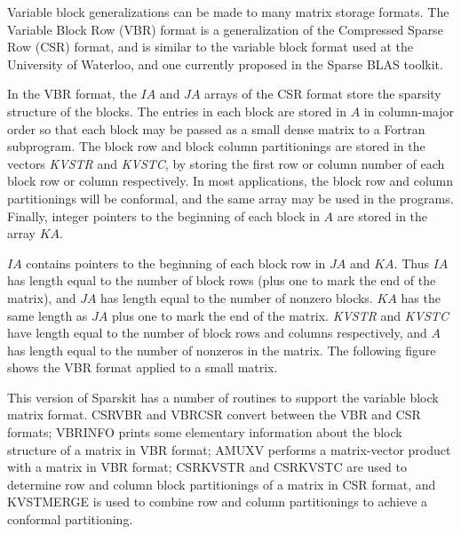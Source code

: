 \documentclass[12pt]{article}
\begin{document}
Variable block generalizations can be made to many matrix storage
formats.  The Variable Block Row (VBR) format is a generalization of the
Compressed Sparse Row (CSR) format, and is similar to the variable
block format used at the University of Waterloo, and one currently
proposed in the Sparse BLAS toolkit.

In the VBR format, the $IA$ and $JA$ arrays of the CSR format store the
sparsity structure of the blocks.  The entries in each block are stored
in $A$ in column-major order so that each block may be passed as a small
dense matrix to a Fortran subprogram.  The block row and block column
partitionings are stored in the vectors {\em KVSTR} and {\em KVSTC},
by storing the first row or column number of each block row or column
respectively.  In most applications, the block row and column partitionings
will be conformal, and the same array may be used in the programs.
Finally, integer pointers to the beginning of each block in $A$ are stored
in the array $KA$.

$IA$ contains pointers to the beginning of each block row in $JA$ and $KA$.
Thus $IA$ has length equal to the number of block rows (plus one to mark
the end of the matrix), and $JA$ has length equal to the number of nonzero
blocks.  $KA$ has the same length as $JA$ plus one to mark the end of
the matrix.  {\em KVSTR} and {\em KVSTC} have length equal to the number
of block rows and columns respectively, and $A$ has length equal to the
number of nonzeros in the matrix.  The following
figure shows the VBR format applied to a small matrix.

This version of Sparskit has a number of routines to support the variable
block matrix format.  CSRVBR and VBRCSR convert between the VBR and CSR
formats; VBRINFO prints some elementary information about the block
structure of a matrix in VBR format; AMUXV performs a matrix-vector product
with a matrix in VBR format; CSRKVSTR and CSRKVSTC are used
to determine row and column block partitionings of a matrix in CSR format,
and KVSTMERGE is used to combine row and column partitionings to achieve
a conformal partitioning.
\end{document}
